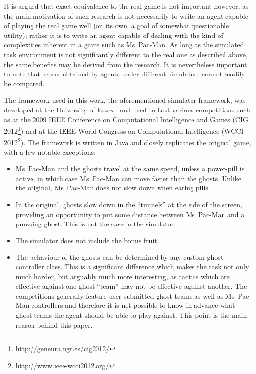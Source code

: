 It is argued that exact equivalence to the real game is not important however, as the main motivation of such research is not necessarily to write an agent capable of playing the real game well (on its own, a goal of somewhat questionable utility); rather it is to write an agent capable of dealing with the kind of complexities inherent in a game such as Ms~Pac-Man.  As long as the simulated task environment is not significantly different to the real one as described above, the same benefits may be derived from the research.  It is nevertheless important to note that scores obtained by agents under different simulators cannot readily be compared.

The framework used in this work, the aforementioned simulator framework, was developed at the University of Essex~\citep{Robles2009} and used to host various competitions such as at the 2009 IEEE Conference on Computational Intelligence and Games (CIG 2012\footnote{\url{http://geneura.ugr.es/cig2012/}}) and at the IEEE World Congress on Computational Intelligence (WCCI 2012\footnote{\url{http://www.ieee-wcci2012.org/}}).  The framework is written in Java and closely replicates the original game, with a few notable exceptions:

\begin{itemize}
\item Ms~Pac-Man and the ghosts travel at the same speed, unless a power-pill is active, in which case Ms~Pac-Man can move faster than the ghosts.  Unlike the original, Ms~Pac-Man does not slow down when eating pills.
\item In the original, ghosts slow down in the ``tunnels'' at the side of the screen, providing an opportunity to put some distance between Ms~Pac-Man and a pursuing ghost.  This is not the case in the simulator.
\item The simulator does not include the bonus fruit.
\item The behaviour of the ghosts can be determined by any custom ghost controller class.  This is a significant difference which makes the task not only much harder, but arguably much more interesting, as tactics which are effective against one ghost ``team'' may not be effective against another.  The competitions generally feature user-submitted ghost teams as well as Ms~Pac-Man controllers and therefore it is not possible to know in advance what ghost teams the agent should be able to play against.  This point is the main reason behind this paper.
\end{itemize}

